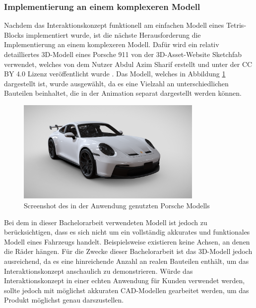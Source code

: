 \subsubsection{Implementierung an einem komplexeren Modell}

Nachdem das Interaktionskonzept funktionell am einfachen Modell eines Tetris-Blocks implementiert wurde, ist die nächste Herausforderung die Implementierung an einem komplexeren Modell.
Dafür wird ein relativ detailliertes 3D-Modell eines Porsche 911 von der 3D-Asset-Website Sketchfab verwendet, welches von dem Nutzer Abdul Azim Sharif erstellt und unter der CC BY 4.0 Lizenz veröffentlicht wurde \autocite[][]{SketchfabPorsche}.
\newpage
Das Modell, welches in Abbildung \ref{fig:porsche} dargestellt ist, wurde ausgewählt, da es eine Vielzahl an unterschiedlichen Bauteilen beinhaltet, die in der Animation separat dargestellt werden können.

\begin{figure}[H]
    \centering
    \includegraphics[width=0.8\textwidth]{images/PorscheModell.png}
    \caption{Screenshot des in der Anwendung genutzten Porsche Modells}
    \label{fig:porsche}
\end{figure}

Bei dem in dieser Bachelorarbeit verwendeten Modell ist jedoch zu berücksichtigen, dass es sich nicht um ein vollständig akkurates und funktionales Modell eines Fahrzeugs handelt.
Beispielsweise existieren keine Achsen, an denen die Räder hängen.
Für die Zwecke dieser Bachelorarbeit ist das 3D-Modell jedoch ausreichend, da es eine hinreichende Anzahl an \glqq{}realen\grqq{} Bauteilen enthält, um das Interaktionskonzept anschaulich zu demonstrieren.
Würde das Interaktionskonzept in einer echten Anwendung für Kunden verwendet werden, sollte jedoch mit möglichst akkuraten CAD-Modellen gearbeitet werden, um das Produkt möglichst genau darszustellen.

